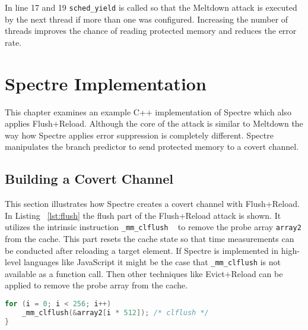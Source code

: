 \documentclass[a4paper,oneside,openright] {scrreprt}
\begin{document}
In line 17 and 19 \texttt{sched\_yield} is called so that the Meltdown attack is executed by the next thread if more
than one was configured. 
Increasing the number of threads improves the chance of reading protected memory and reduces the error rate.


\section{Spectre Implementation}
\label{ch:intro:motivation}

This chapter examines an example C++ implementation of Spectre which also applies Flush+Reload. 
Although the core of the attack is similar to Meltdown the way how Spectre applies
error suppression is completely different. 
Spectre manipulates the branch predictor to send protected memory to a covert channel.

\subsection{Building a Covert Channel}
\label{ch:intro:motivation:A}
 
This section illustrates how Spectre creates a covert channel with Flush+Reload. 
In Listing ~\ref{lst:flush} the flush part of the Flush+Reload attack is shown. It utilizes the intrinsic instruction 
\texttt{\_mm\_clflush} ~\cite{intelintrinsics} to remove the probe array \texttt{array2} from the cache. 
This part resets the cache state so that time measurements can be conducted after reloading a target element.
If Spectre is implemented in high-level languages like JavaScript it
might be the case that \texttt{\_mm\_clflush} is not available as a function call. 
Then other techniques like Evict+Reload can be applied to remove the probe array from the cache.

\begin{lstlisting}[language=C, caption=Spectre: Flush, label={lst:flush}]
for (i = 0; i < 256; i++)
    _mm_clflush(&array2[i * 512]); /* clflush */
}
\end{lstlisting}
\end{document}
